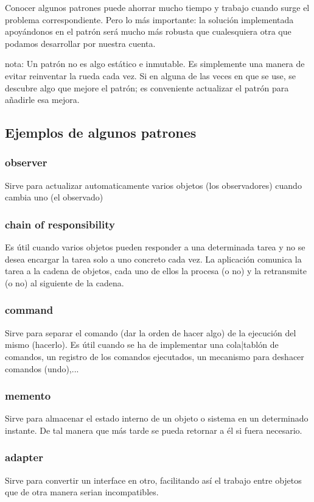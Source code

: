 \documentclass[spanish,12pt,a4paper,final,oneside]{book}
\begin{document}
Conocer algunos patrones puede ahorrar mucho tiempo y trabajo cuando surge el problema correspondiente. Pero lo más importante: la solución implementada apoyándonos en el patrón será mucho más robusta que cualesquiera otra que podamos desarrollar por nuestra cuenta.

nota: Un patrón no es algo estático e inmutable. Es simplemente una manera de evitar reinventar la rueda cada vez. Si en alguna de las veces en que se use, se descubre algo que mejore el patrón; es conveniente actualizar el patrón para añadirle esa mejora.

\subsection{Ejemplos de algunos patrones}
\subsubsection{observer}
Sirve para actualizar automaticamente varios objetos (los observadores)  cuando cambia uno (el observado)
\subsubsection{chain of responsibility}
Es útil cuando varios objetos pueden responder a una determinada tarea y no se desea encargar la tarea solo a uno concreto cada vez. La aplicación comunica la tarea a la cadena de objetos, cada uno de ellos la procesa (o no) y la retransmite (o no) al siguiente de la cadena.
\subsubsection{command}
Sirve para separar el comando (dar la orden de hacer algo) de la ejecución del mismo (hacerlo). Es útil cuando se ha de implementar una cola|tablón de comandos, un registro de los comandos ejecutados, un mecanismo para deshacer comandos (undo),...
\subsubsection{memento}
Sirve para almacenar el estado interno de un objeto o sistema en un determinado instante. De tal manera que más tarde se pueda retornar a él si fuera necesario.
\subsubsection{adapter}
Sirve para convertir un interface en otro, facilitando así el trabajo entre objetos que de otra manera serian incompatibles. 
\end{document}
